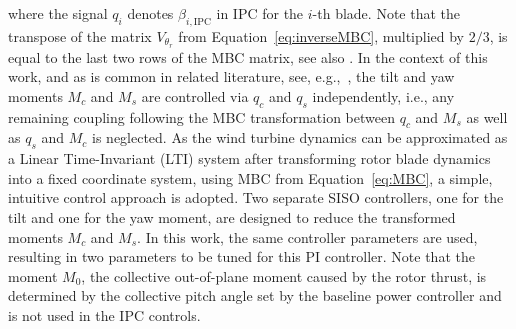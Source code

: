 where the signal $q_i$ denotes $\beta_{i,\text{IPC}}$ in IPC for the $i$-th blade. %
Note that the transpose of the matrix $V_{\theta_{r}}$ from Equation~\eqref{eq:inverseMBC}, multiplied by $2/3$, is equal to the last two rows of the MBC matrix, see also \cite{ossmann2017load}. In the context of this work, and as is common in related literature, see, e.g.,~\cite{he2018combined}, the tilt and yaw moments $M_c$ and $M_s$ are controlled via $q_c$ and $q_s$ independently, i.e., any remaining coupling following the MBC transformation between $q_c$ and $M_s$ as well as $q_s$ and $M_c$ is neglected. As the wind turbine dynamics can be approximated as a Linear Time-Invariant (LTI) system after transforming rotor blade dynamics into a fixed coordinate system, using MBC from Equation~\eqref{eq:MBC}, a simple, intuitive control approach is adopted. Two separate SISO controllers, one for the tilt and one for the yaw moment, are designed to reduce the transformed moments $M_c$ and $M_s$. In this work, the same controller parameters are used, resulting in two parameters to be tuned for this PI controller. Note that the moment $M_0$, the collective out-of-plane moment caused by the rotor thrust, is determined by the collective pitch angle set by the baseline power controller and is not used in the IPC controls.

